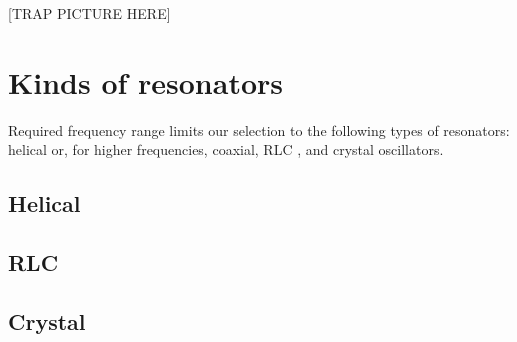 [TRAP PICTURE HERE]

\section{Kinds of resonators}
\label{sec:kinds_resonators}
Required frequency range limits our selection to the following types of resonators: helical \cite{Gulde2017} or, for higher frequencies, coaxial, RLC \cite{Gandolfi2010}, and crystal oscillators.
\subsection{Helical}
\subsection{RLC}
\subsection{Crystal}